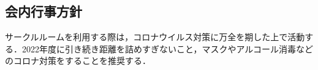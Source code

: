 \subsection*{会内行事方針}


サークルルームを利用する際は，コロナウイルス対策に万全を期した上で活動する．2022年度に引き続き距離を詰めすぎないこと，マスクやアルコール消毒などのコロナ対策をすることを推奨する．